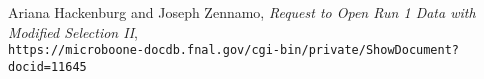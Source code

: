 \begin{thebibliography}{20}
% 
%
%
%
% 
%
%
%

 Ariana Hackenburg and Joseph Zennamo, \emph{Request to Open Run 1 Data with Modified Selection II},\\
 \texttt{https://microboone-docdb.fnal.gov/cgi-bin/private/ShowDocument?docid=11645}
 


\end{thebibliography}

